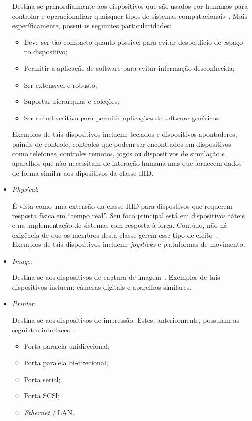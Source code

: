 \begin{itemize}
	Destina-se primordialmente aos dispositivos que são usados por humanos para controlar e operacionalizar quaisquer tipos de sistemas computacionais~\cite{hid}. Mais específicamente, possui as seguintes particularidades:
	\begin{itemize}
		\item Deve ser tão compacto quanto possível para evitar desperdício de espaço no dispositivo;
		\item Permitir a aplicação de software para evitar informação desconhecida;
		\item Ser extensível e robusto;
		\item Suportar hierarquias e coleções;
		\item Ser autodescritivo para permitir aplicações de software genéricos.
	\end{itemize}

	Exemplos de tais dispositivos incluem: teclados e dispositivos apontadores, painéis de controle, controles que podem ser encontrados em dispositivos como telefones, controles remotos, jogos ou dispositivos de simulação e aparelhos que não necessitam de interação humana mas que fornecem dados de forma similar aos dipositivos da classe HID.
	\item \emph{Physical}: 

	É vista como uma extensão da classe HID para dispostivos que requerem resposta física em ``tempo real''. Seu foco principal está em dispositivos táteis e na implementação de sistemas com resposta à força. Contúdo, não há exigência de que os membros desta classe gerem esse tipo de efeito~\cite{usbphysicalclass}. Exemplos de tais dispositivos incluem: \emph{joysticks} e plataformas de movimento.
	\item \emph{Image}: 

	Destina-se aos dispositivos de captura de imagem~\cite{usbimageclass}. Exemplos de tais dispositivos incluem: câmeras digitais e aparelhos similares.
	\item \emph{Printer}: 

	Destina-se aos dispositivos de impressão. Estes, anteriormente, possuíam as seguintes interfaces~\cite{usbprintclass}:
	\begin{itemize}
		\item Porta paralela unidirecional;
		\item Porta paralela bi-direcional;
		\item Porta serial;
		\item Porta SCSI;
		\item \emph{Ethernet} / LAN.
	\end{itemize}


\end{itemize}
